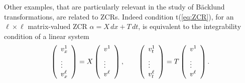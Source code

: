 \documentclass[12pt,english]{elsarticle}
\theoremstyle{plain}
\theoremstyle{plain}
\theoremstyle{remark}
\theoremstyle{plain}
\theoremstyle{definition}
\theoremstyle{definition}
\begin{document}
Other examples, that are particularly relevant in the study of B\"{a}cklund
transformations, are related to ZCRs. Indeed condition t{(\ref{eq:ZCR})},
for an $\ell \times \ell $ matrix-valued ZCR $\alpha =X\,dx+T\,dt$, is
equivalent to the integrability condition of a linear system
%
\begin{equation*}
\left (
%
\begin{array}{l}
v_{x}^{1}
\vspace{5pt}
\\
\vdots
\\
v_{x}^{\ell}
\end{array}
%
\right )=X\left (
%
\begin{array}{l}
v^{1}
\vspace{5pt}
\\
\vdots
\\
v^{\ell}
\end{array}
%
\right ),\qquad \left (
%
\begin{array}{l}
v_{t}^{1}
\vspace{5pt}
\\
\vdots
\\
v_{t}^{\ell}
\end{array}
%
\right )=T\left (
%
\begin{array}{l}
v^{1}
\vspace{5pt}
\\
\vdots
\\
v^{\ell}
\end{array}
%
\right ).
\end{equation*}
\end{document}
